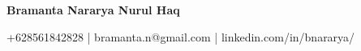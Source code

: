 \begin{center}
    \textbf{\huge Bramanta Nararya Nurul Haq}
\end{center}

\begin{center}
    +628561842828 | bramanta.n@gmail.com | linkedin.com/in/bnararya/
\end{center}